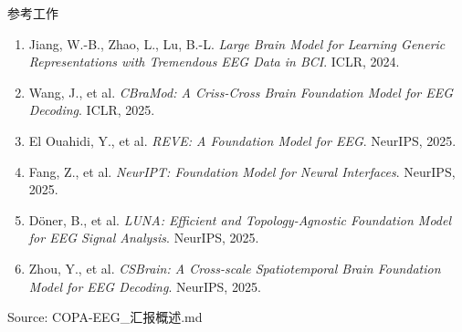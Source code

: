\documentclass[10pt,aspectratio=169]{beamer}
\newcommand{\source}[1]{{\vspace{0.08em}\fontsize{6.5}{8}\selectfont\color{warmgray}Source: #1\par}}
\begin{document}
\begin{frame}[t]{参考工作}
\vspace{0.10cm}
{\fontsize{7.2}{9.2}\selectfont
\begin{enumerate}
  \setlength{\itemsep}{0.18em}
  \item Jiang, W.-B., Zhao, L., Lu, B.-L.
    \emph{Large Brain Model for Learning Generic Representations with Tremendous EEG Data in BCI}. ICLR, 2024.
  \item Wang, J., et al.
    \emph{CBraMod: A Criss-Cross Brain Foundation Model for EEG Decoding}. ICLR, 2025.
  \item El Ouahidi, Y., et al.
    \emph{REVE: A Foundation Model for EEG}. NeurIPS, 2025.
  \item Fang, Z., et al.
    \emph{NeurIPT: Foundation Model for Neural Interfaces}. NeurIPS, 2025.
  \item Döner, B., et al.
    \emph{LUNA: Efficient and Topology-Agnostic Foundation Model for EEG Signal Analysis}. NeurIPS, 2025.
  \item Zhou, Y., et al.
    \emph{CSBrain: A Cross-scale Spatiotemporal Brain Foundation Model for EEG Decoding}. NeurIPS, 2025.
\end{enumerate}
}
\source{COPA-EEG\_汇报概述.md}
\end{frame}
\end{document}
